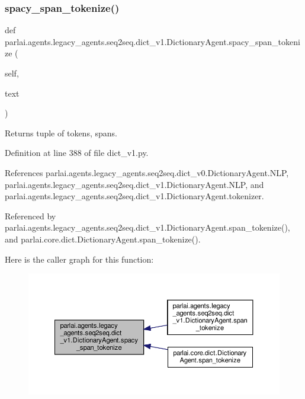 \subsubsection{\texorpdfstring{spacy\+\_\+span\+\_\+tokenize()}{spacy\_span\_tokenize()}}
{\footnotesize\ttfamily def parlai.\+agents.\+legacy\+\_\+agents.\+seq2seq.\+dict\+\_\+v1.\+Dictionary\+Agent.\+spacy\+\_\+span\+\_\+tokenize (\begin{DoxyParamCaption}\item[{}]{self,  }\item[{}]{text }\end{DoxyParamCaption})}

\begin{DoxyVerb}Returns tuple of tokens, spans.\end{DoxyVerb}
 

Definition at line 388 of file dict\+\_\+v1.\+py.



References parlai.\+agents.\+legacy\+\_\+agents.\+seq2seq.\+dict\+\_\+v0.\+Dictionary\+Agent.\+N\+LP, parlai.\+agents.\+legacy\+\_\+agents.\+seq2seq.\+dict\+\_\+v1.\+Dictionary\+Agent.\+N\+LP, and parlai.\+agents.\+legacy\+\_\+agents.\+seq2seq.\+dict\+\_\+v1.\+Dictionary\+Agent.\+tokenizer.



Referenced by parlai.\+agents.\+legacy\+\_\+agents.\+seq2seq.\+dict\+\_\+v1.\+Dictionary\+Agent.\+span\+\_\+tokenize(), and parlai.\+core.\+dict.\+Dictionary\+Agent.\+span\+\_\+tokenize().

Here is the caller graph for this function\+:
\nopagebreak
\begin{figure}[H]
\begin{center}
\leavevmode
\includegraphics[width=350pt]{classparlai_1_1agents_1_1legacy__agents_1_1seq2seq_1_1dict__v1_1_1DictionaryAgent_a995253a4769e95991e0ba9174a37f6aa_icgraph}
\end{center}
\end{figure}
\mbox{\label{classparlai_1_1agents_1_1legacy__agents_1_1seq2seq_1_1dict__v1_1_1DictionaryAgent_a295893b8c3887c04200fcf2420ed33d2}} 
